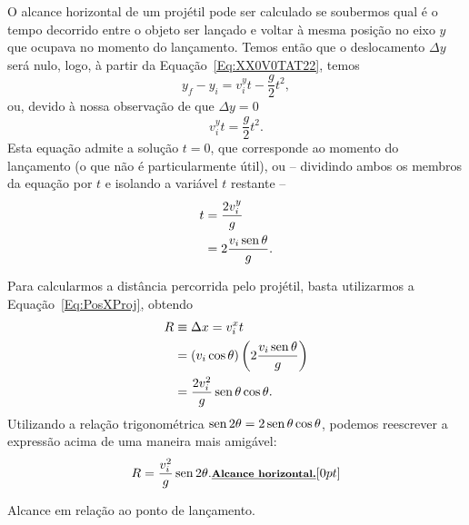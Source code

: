 O alcance horizontal de um projétil pode ser calculado se soubermos qual é o tempo decorrido entre o objeto ser lançado e voltar à mesma posição no eixo $y$ que ocupava no momento do lançamento. Temos então que o deslocamento $\Delta y$ será nulo, logo, à partir da Equação~\eqref{Eq:XX0V0TAT22}, temos
\begin{equation}
  y_f-y_i = v_{i}^{y}t - \frac{g}{2}t^2,
\end{equation}
%
ou, devido à nossa observação de que $\Delta y = 0$
\begin{equation}
  v_{i}^{y}t = \frac{g}{2} t^2.
\end{equation}
%
Esta equação admite a solução $t = 0$, que corresponde ao momento do lançamento (o que não é particularmente útil), ou -- dividindo ambos os membros da equação por $t$ e isolando a variável $t$ restante --
\begin{align}
  t &= \frac{2v_{i}^{y}}{g} \\
  &= 2\frac{v_i\operatorname{sen}\theta}{g}.
\end{align}

Para calcularmos a distância percorrida pelo projétil, basta utilizarmos a Equação~\eqref{Eq:PosXProj}, obtendo
\begin{align}
  R &\equiv \Delta x = v_{i}^{x} t \\
  &= \left(v_i\cos\theta\right) \left(2\frac{v_i\operatorname{sen}\theta}{g}\right) \\
  &= \frac{2v_i^2}{g}\operatorname{sen}\theta\cos\theta.
\end{align}
%
Utilizando a relação trigonométrica $\operatorname{sen} 2\theta = 2 \operatorname{sen}\theta\cos\theta$, podemos reescrever a expressão acima de uma maneira mais amigável:
\begin{equation}\label{Eq:Alcance}
  R = \frac{v_i^2}{g}\operatorname{sen}2\theta. \relax{\footnotesize\emph{\textbf{Alcance horizontal.}}}[0pt]
\end{equation}

\begin{marginfigure}[-7cm]
\centering
{}
\caption{Alcance em relação ao ponto de lançamento.}
\end{marginfigure}

